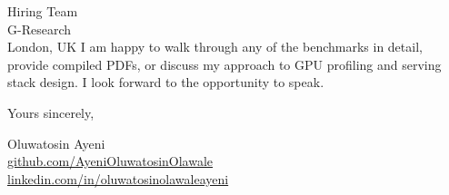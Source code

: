\documentclass[12pt,a4paper]{letter}
\begin{document}
\begin{letter}{Hiring Team \\ G-Research \\ London, UK}
I am happy to walk through any of the benchmarks in detail, provide compiled PDFs, or discuss my approach to GPU profiling and serving stack design. I look forward to the opportunity to speak.

\closing{Yours sincerely,}

Oluwatosin Ayeni \\
\href{https://github.com/AyeniOluwatosinOlawale}{github.com/AyeniOluwatosinOlawale} \\
\href{https://www.linkedin.com/in/oluwatosinolawaleayeni/}{linkedin.com/in/oluwatosinolawaleayeni}

\end{letter}
\end{document}
